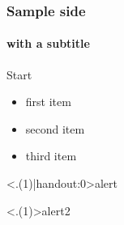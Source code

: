 \documentclass[handout]{beamer}
\begin{document}
\begin{frame}
\frametitle{Sample side}
\framesubtitle{with a subtitle}

Start
\begin{itemize}[<+(1)-| alert@+(1)>]
\item  first item 
\vspace{1cm}
\item second item 
\vspace{1cm}
\item  third item
\end{itemize}
\pause
\alert<.(1)|handout:0>{alert}

\pause
\alert<.(1)>{alert2}
\end{frame}
\end{document}
